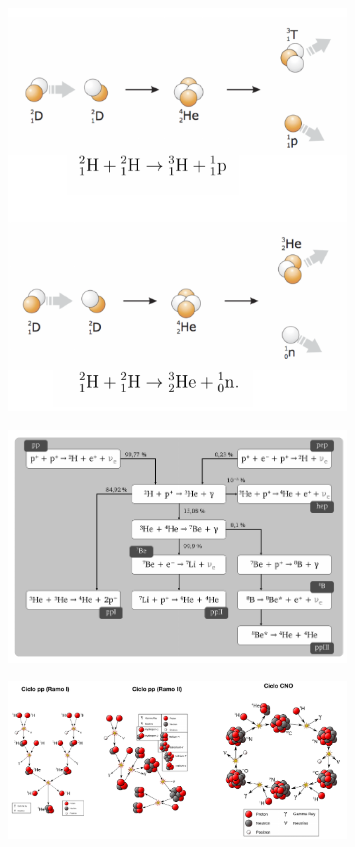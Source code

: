 \begin{figure}
    \centering
    \includegraphics[width=0.8\textwidth]{Figures/nuclear-physics3-fig10.pdf}
    \caption{}
    \label{fig:nuclear-physics3-fig10}
\end{figure}

\begin{figure}
    \centering
    \includegraphics[width=0.8\textwidth]{Figures/nuclear-physics3-fig11.pdf}
    \caption{}
    \label{fig:nuclear-physics3-fig11}
\end{figure}

\begin{figure}
    \centering
    \includegraphics[width=0.8\textwidth]{Figures/nuclear-physics3-fig12.pdf}
    \caption{}
    \label{fig:nuclear-physics3-fig12}
\end{figure}


